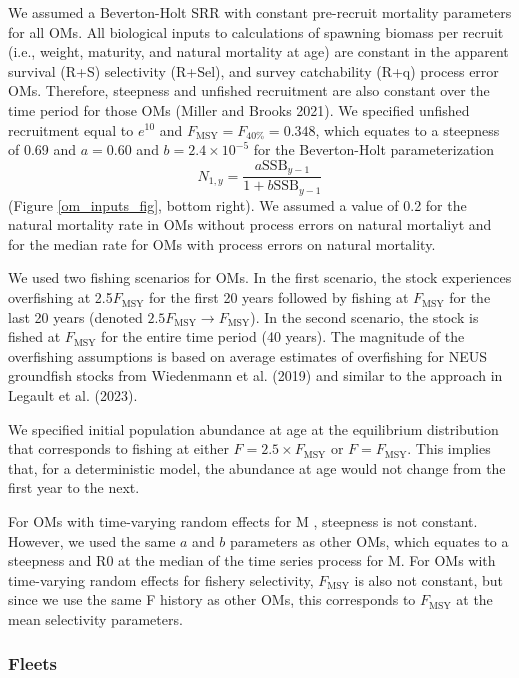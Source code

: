 \documentclass[
  12pt,
]{article}
\newcommand{\Fmsy}{\ensuremath{F_{\text{MSY}}}\xspace}
\begin{document}
We assumed a Beverton-Holt SRR with constant pre-recruit mortality
parameters for all OMs. All biological inputs to calculations of
spawning biomass per recruit (i.e., weight, maturity, and natural
mortality at age) are constant in the apparent survival (R+S)
selectivity (R+Sel), and survey catchability (R+q) process error OMs.
Therefore, steepness and unfished recruitment are also constant over the
time period for those OMs (Miller and Brooks 2021). We specified
unfished recruitment equal to \(e^{10}\) and
\(\Fmsy = F_{40\%} = 0.348\), which equates to a steepness of 0.69 and
\(a=0.60\) and \(b = 2.4 \times 10^{-5}\) for the Beverton-Holt
parameterization \[
N_{1,y} = \frac{a \text{SSB}_{y-1}}{1 + b \text{SSB}_{y-1}} 
\] (Figure \ref{om_inputs_fig}, bottom right). We assumed a value of 0.2
for the natural mortality rate in OMs without process errors on natural
mortaliyt and for the median rate for OMs with process errors on natural
mortality.

We used two fishing scenarios for OMs. In the first scenario, the stock
experiences overfishing at 2.5\Fmsy for the first 20 years followed by
fishing at \Fmsy for the last 20 years (denoted
\(2.5\Fmsy \rightarrow \Fmsy\)). In the second scenario, the stock is
fished at \Fmsy for the entire time period (40 years). The magnitude of
the overfishing assumptions is based on average estimates of overfishing
for NEUS groundfish stocks from Wiedenmann et al. (2019) and similar to
the approach in Legault et al. (2023).

We specified initial population abundance at age at the equilibrium
distribution that corresponds to fishing at either
\(F = 2.5\times \Fmsy\) or \(F = \Fmsy\). This implies that, for a
deterministic model, the abundance at age would not change from the
first year to the next.

For OMs with time-varying random effects for M , steepness is not
constant. However, we used the same \(a\) and \(b\) parameters as other
OMs, which equates to a steepness and R0 at the median of the time
series process for M. For OMs with time-varying random effects for
fishery selectivity, \Fmsy is also not constant, but since we use the
same F history as other OMs, this corresponds to \Fmsy at the mean
selectivity parameters.

\hypertarget{fleets}{%
\subsubsection*{Fleets}\label{fleets}}
\end{document}
